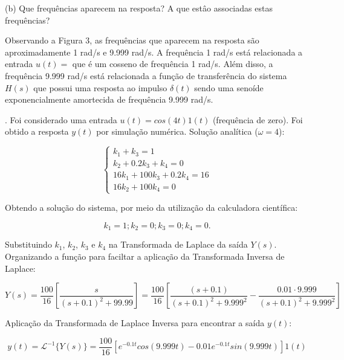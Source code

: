 \documentclass[10pt]{article}
\begin{document}
(b) Que frequências aparecem na resposta? A que estâo associadas estas frequências?

\quad Observando a Figura 3, as frequências que aparecem na resposta são aproximadamente 1 rad/s e 9.999 rad/s.
A frequência 1 rad/s está relacionada a entrada $u(t) = $ que é um cosseno de frequência 1 rad/s.
Além disso, a frequência 9.999 rad/s está relacionada a função de transferência do sistema $H(s)$
que possui uma resposta ao impulso $\delta(t)$ sendo uma senoíde exponencialmente amortecida de frequência 9.999 rad/s.

\newpage

. Foi considerado uma entrada $u(t) = cos(4 t) 1(t)$ (frequência de zero). Foi obtido a resposta $y(t)$ por simulação numérica. Solução analítica ($\omega = 4$):

\begin{equation}
    \left\{
    \begin{array}{l}
        k_1 + k_3 = 1 \\
        k_2 + 0.2k_3 +k_4 = 0 \\
        16k_1 + 100k_3 + 0.2k_4 = 16 \\
        16k_2 + 100k_4 = 0
    \end{array}
    \right. 
\end{equation}

\quad Obtendo a solução do sistema, por meio da utilização da calculadora científica:

\begin{equation}
    k_1 = 1; k_2 = 0; k_3 = 0; k_4 = 0.
\end{equation}

\quad Substituindo $k_1$, $k_2$, $k_3$ e $k_4$ na Transformada de Laplace da saída $Y(s)$.
Organizando a função para faciltar a aplicação da Transformada Inversa de Laplace:

\begin{equation}
    Y(s) = \frac{100}{16} \left[ \frac{s}{(s + 0.1)^2 + 99.99} \right] = \frac{100}{16} \left[ \frac{(s + 0.1)}{(s + 0.1)^2 + 9.999^2} - \frac{0.01 \cdot 9.999}{(s + 0.1)^2 + 9.999^2} \right]
\end{equation}

\quad Aplicação da Transformada de Laplace Inversa para encontrar a saída $y(t)$:

\begin{equation}
    y(t) = \mathcal{L}^{-1} \{Y(s) \} = \frac{100}{16} \left[ e^{-0.1t}cos(9.999t) - 0.01e^{-0.1t}sin(9.999t) \right] 1(t)
\end{equation}
\end{document}
